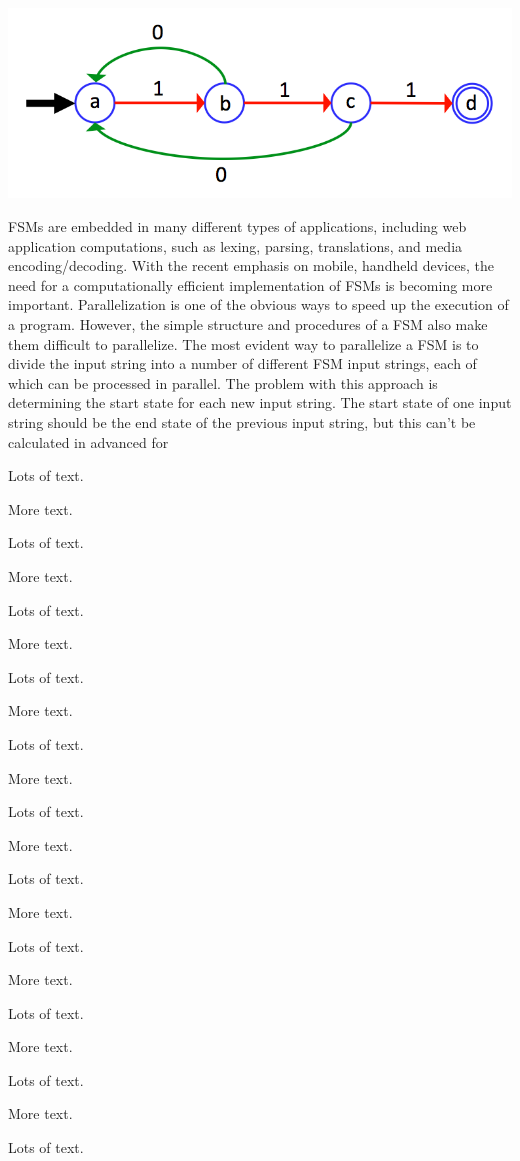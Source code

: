 \documentclass{sigplanconf}
\begin{document}
\includegraphics[width=\linewidth]{fsm_diagram.png}

FSMs are embedded in many different types of applications, including web application computations, such as lexing, parsing, translations, and media encoding/decoding. With the recent emphasis on mobile, handheld devices, the need for a computationally efficient implementation of FSMs is becoming more important. Parallelization is one of the obvious ways to speed up the execution of a program. However, the simple structure and procedures of a FSM also make them difficult to parallelize. The most evident way to parallelize a FSM is to divide the input string into a number of different FSM input strings, each of which can be processed in parallel. The problem with this approach is determining the start state for each new input string. The start state of one input string should be the end state of the previous input string, but this can't be calculated in advanced for

Lots of text.

More text.

Lots of text.

More text.


Lots of text.

More text.

Lots of text.

More text.


Lots of text.

More text.

Lots of text.

More text.

Lots of text.

More text.

Lots of text.

More text.

Lots of text.

More text.

Lots of text.

More text.

Lots of text.
\end{document}
